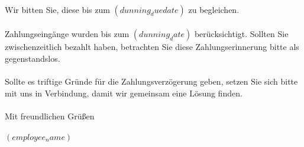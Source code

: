 \documentclass[twoside]{scrartcl}
\begin{document}
\vspace*{2em} \\
Wir bitten Sie, diese bis zum $(dunning_duedate)$ zu begleichen.\\%
\vspace*{1em} \\
Zahlungseingänge wurden bis zum $(dunning_date)$ berücksichtigt.
Sollten Sie zwischenzeitlich bezahlt haben, betrachten Sie diese
Zahlungserinnerung bitte als gegenstandslos.\\%
\vspace*{2em} \\
Sollte es triftige Gründe für die Zahlungsverzögerung geben, setzen Sie sich
bitte mit uns in Verbindung, damit wir gemeinsam eine Lösung finden.\\ %
\vspace*{2em} \\
Mit freundlichen Grüßen\\ %
\vspace*{1em} \\
$(employee_name)$
\end{document}
